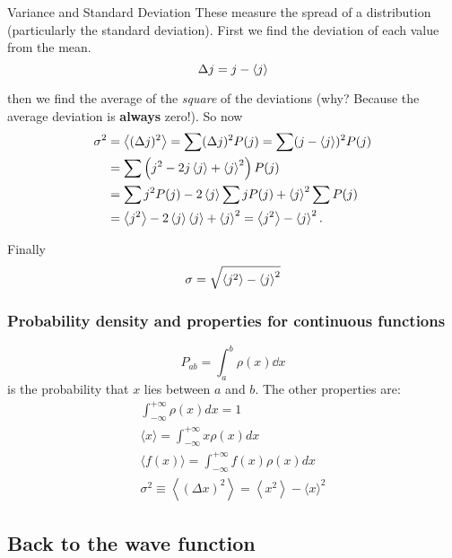\begin{frame}{Variance and Standard Deviation}
    These measure the spread of a distribution (particularly the standard deviation).
    First we find the deviation of each value from the mean.
    \[
        \Delta j = j - \ev j
    \]

    then we find the average of the \textit{square} of the deviations (why? Because the average deviation is \textbf{always} zero!). So now
    \begin{align*}
        \sigma^2 & =\ev{(\Delta j)^2} = \sum(\Delta j)^2 P(j)=\sum(j-\ev{j})^2 P(j) \\
        & =\sum\left(j^2-2 j \ev{j} + \ev{j}^2\right) P(j) \\
        & =\sum j^2 P(j)-2 \ev{j} \sum j P(j)+\ev{j}^2 \sum P(j) \\
        & =\ev{ j^2}-2\ev{ j}\ev{ j}+\ev{ j}^2=\ev{ j^2}-\ev{ j}^2 .
    \end{align*}

    Finally $$\sigma = \sqrt{\ev{ j^2}-\ev{ j}^2}$$
\end{frame}


\begin{frame}
    \frametitle{Probability density and properties for continuous functions}
    $$ P_{ab} = \int_a^b \rho(x) \dd{x}$$
    is the probability that $x$ lies between $a$ and $b$. The other properties are:
    \begin{gather}
    \int_{-\infty}^{+\infty} \rho(x) d x=1 \\
    \langle x\rangle=\int_{-\infty}^{+\infty} x \rho(x) d x \\
    \langle f(x)\rangle=\int_{-\infty}^{+\infty} f(x) \rho(x) d x \\
    \sigma^2 \equiv\left\langle(\Delta x)^2\right\rangle=\left\langle x^2\right\rangle-\langle x\rangle^2
\end{gather}

\end{frame}

\subsection{Back to the wave function}




